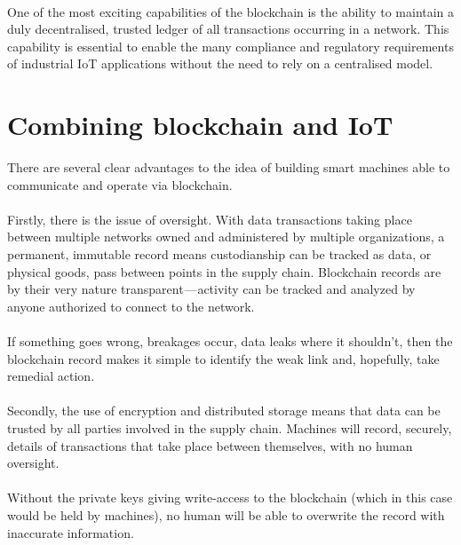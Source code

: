 \paragraph{}One of the most exciting capabilities of the blockchain is the ability to maintain a duly decentralised, trusted ledger of all transactions occurring in a network. This capability is essential to enable the many compliance and regulatory requirements of industrial IoT applications without the need to rely on a centralised model.

\section{Combining blockchain and IoT}
There are several clear advantages to the idea of building smart machines able to communicate and operate via blockchain.

\paragraph{}Firstly, there is the issue of oversight. With data transactions taking place between multiple networks owned and administered by multiple organizations, a permanent, immutable record means custodianship can be tracked as data, or physical goods, pass between points in the supply chain. Blockchain records are by their very nature transparent — activity can be tracked and analyzed by anyone authorized to connect to the network.

\paragraph{}If something goes wrong, breakages occur, data leaks where it shouldn’t, then the blockchain record makes it simple to identify the weak link and, hopefully, take remedial action.

\paragraph{}Secondly, the use of encryption and distributed storage means that data can be trusted by all parties involved in the supply chain. Machines will record, securely, details of transactions that take place between themselves, with no human oversight.

\paragraph{}Without the private keys giving write-access to the blockchain (which in this case would be held by machines), no human will be able to overwrite the record with inaccurate information.

